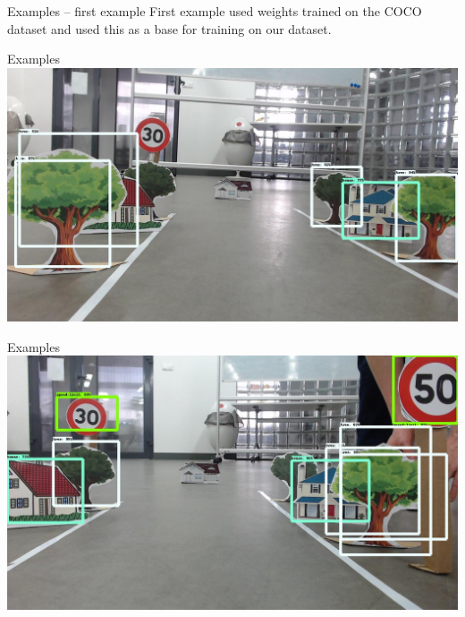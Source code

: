 \documentclass[aspectratio=1610,english]{beamer} %
\begin{document}
  	\begin{frame}{Examples -- first example}
		First example used weights trained on the COCO dataset and used this as a base for training on our dataset.
	\end{frame}
  	\begin{frame}{Examples}
		\includegraphics[scale=0.3]{examples/comparison_1000_step/session_one-6.jpg}
	\end{frame}
  	\begin{frame}{Examples}
		\includegraphics[scale=0.3]{examples/comparison_1000_step/session_one-10.jpg}
	\end{frame}
	
\end{document}
